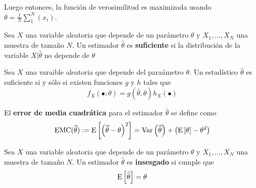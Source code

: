 Luego entonces, la función de verosimilitud es maximizada usando $\theta = \frac{1}{N} \sum_{1}^{N}(x_i)$.

\begin{definicion}
Sea $X$ una variable aleatoria que depende de un parámetro $\theta$ y $X_1, \dots, X_N$ una muestra de tamaño $N$. Un estimador $\widehat{\theta}$ es \textbf{suficiente} si
la distribución de la variable $X \lvert \widehat{\theta}$ no depende de $\theta$
\end{definicion}

\begin{teorema}
Sea $X$ una varaible aleatoria que depende del paraámetro $\theta$. Un estadístico $\widehat{\theta}$ es suficiente si y sólo si existen funciones $g$ y $h$ tales que
\begin{equation}
f_X(\bullet; \theta ) = g(\widehat{\theta},\theta) h_X(\bullet)
\end{equation}
\end{teorema}




\begin{definicion}
El \textbf{error de media cuadrática} para el estimador $\widehat{\theta}$ se define como
\begin{equation}
\text{EMC}(\widehat{\theta}) := \mathrm{E}\left[ \left( \widehat{\theta} - \theta \right)^{2} \right] =
\mathrm{Var}\left( \widehat{\theta} \right) + \left( \mathrm{E}\left[ \theta \right] - \theta^{2} \right)
\end{equation}
\end{definicion}

\begin{definicion}
Sea $X$ una variable aleatoria que depende de un parámetro $\theta$ y $X_1, \dots, X_N$ una muestra de tamaño $N$. Un estimador $\widehat{\theta}$ es \textbf{insesgado} si cumple que
\begin{equation}
\mathrm{E}\left[ \widehat{\theta} \right] = \theta
\end{equation}
\end{definicion}


